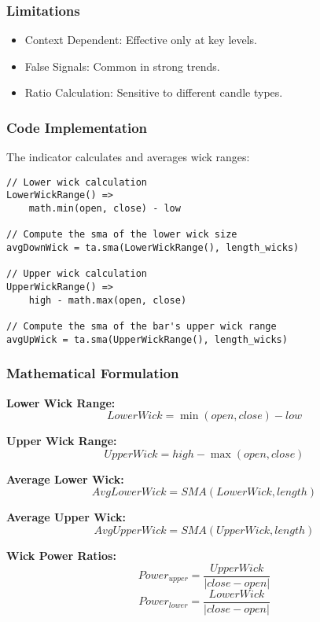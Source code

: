 \documentclass[12pt]{article}
\begin{document}
\subsubsection{Limitations}
\begin{itemize}
\item Context Dependent: Effective only at key levels.
\item False Signals: Common in strong trends.
\item Ratio Calculation: Sensitive to different candle types.
\end{itemize}

\subsubsection{Code Implementation}
The indicator calculates and averages wick ranges:

\begin{lstlisting}[language=Pine, caption=Pine Script Code for Wick Power Shift]
// Lower wick calculation
LowerWickRange() =>
	math.min(open, close) - low

// Compute the sma of the lower wick size
avgDownWick = ta.sma(LowerWickRange(), length_wicks)

// Upper wick calculation
UpperWickRange() =>
	high - math.max(open, close)

// Compute the sma of the bar's upper wick range
avgUpWick = ta.sma(UpperWickRange(), length_wicks)
\end{lstlisting}

\subsubsection{Mathematical Formulation}
\textbf{Lower Wick Range:}
\[
LowerWick = \min(open, close) - low
\]

\textbf{Upper Wick Range:}
\[
UpperWick = high - \max(open, close)
\]

\textbf{Average Lower Wick:}
\[
AvgLowerWick = SMA(LowerWick, length)
\]

\textbf{Average Upper Wick:}
\[
AvgUpperWick = SMA(UpperWick, length)
\]

\textbf{Wick Power Ratios:}
\[
Power_{upper} = \frac{UpperWick}{|close - open|}
\]
\[
Power_{lower} = \frac{LowerWick}{|close - open|}
\]
\end{document}
